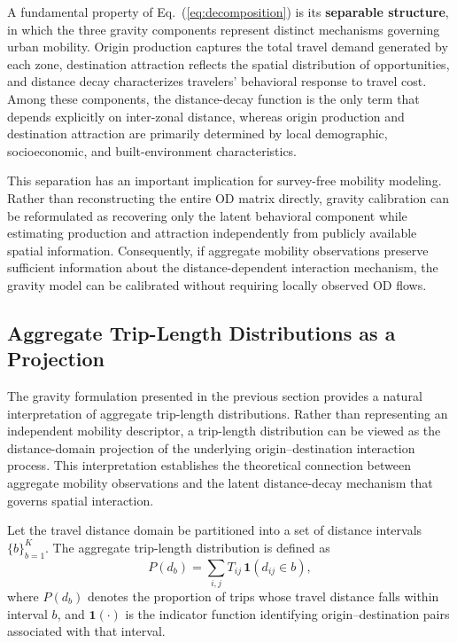 A fundamental property of Eq.~(\ref{eq:decomposition}) is its \textbf{separable structure}, in which the three gravity components represent distinct mechanisms governing urban mobility. Origin production captures the total travel demand generated by each zone, destination attraction reflects the spatial distribution of opportunities, and distance decay characterizes travelers' behavioral response to travel cost. Among these components, the distance-decay function is the only term that depends explicitly on inter-zonal distance, whereas origin production and destination attraction are primarily determined by local demographic, socioeconomic, and built-environment characteristics.

This separation has an important implication for survey-free mobility modeling. Rather than reconstructing the entire OD matrix directly, gravity calibration can be reformulated as recovering only the latent behavioral component while estimating production and attraction independently from publicly available spatial information. Consequently, if aggregate mobility observations preserve sufficient information about the distance-dependent interaction mechanism, the gravity model can be calibrated without requiring locally observed OD flows.

\subsection{Aggregate Trip-Length Distributions as a Projection}\label{sec:aggregate_projection}

The gravity formulation presented in the previous section provides a natural interpretation of aggregate trip-length distributions. Rather than representing an independent mobility descriptor, a trip-length distribution can be viewed as the distance-domain projection of the underlying origin--destination interaction process. This interpretation establishes the theoretical connection between aggregate mobility observations and the latent distance-decay mechanism that governs spatial interaction.

Let the travel distance domain be partitioned into a set of distance intervals $\{b\}_{b=1}^{K}$. The aggregate trip-length distribution is defined as
\begin{equation}
P(d_b) = \sum_{i,j} T_{ij}\, \mathbf{1}(d_{ij} \in b),
\end{equation}
where $P(d_b)$ denotes the proportion of trips whose travel distance falls within interval $b$, and $\mathbf{1}(\cdot)$ is the indicator function identifying origin--destination pairs associated with that interval.

